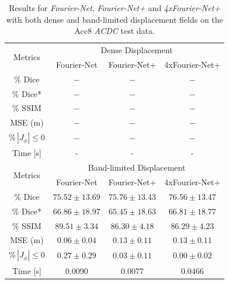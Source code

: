 \documentclass[english,version-2022-01]{uzl-thesis} %
\begin{document}
\begin{table}[H] %
	\centering
	\caption{Results for \emph{Fourier-Net}, \emph{Fourier-Net+} and \emph{4xFourier-Net+} with both dense and band-limited displacement fields on the Acc8 \emph{ACDC} test data.}
	\label{tab:DenseDisplacementAcc8}
	\begin{tabular}{c c c c} %
		\toprule
		\multirow{2}{*}{Metrics} & \multicolumn{3}{c}{Dense Displacement} \\
		\cline{2-4} 
		 & Fourier-Net & Fourier-Net+ & 4xFourier-Net+\\	
		\midrule
		$\%$ Dice & $-$ & $-$ & $-$\\
		$\%$ Dice* & $-$ & $-$ & $-$ \\
		$\%$ SSIM & $-$ & $-$ & $-$\\
		MSE (m) & $-$ & $-$ & $-$ \\
		$\% \, |J_{\phi}|\leq0$ & $-$ & $-$ & $-$ \\
		Time [s] 	  & - & - & -  \\
		\midrule
		\multirow{2}{*}{Metrics} & \multicolumn{3}{c}{Band-limited Displacement} \\
		\cline{2-4} 
		 & Fourier-Net & Fourier-Net+ & 4xFourier-Net+\\		
		\midrule
		$\%$ Dice & $75.52 \pm 13.69$ & $75.76 \pm 13.43$ & $76.56 \pm 13.47$\\
		$\%$ Dice* & $66.86 \pm 18.97$ & $65.45 \pm 18.63$ & $66.81 \pm 18.77$ \\
		$\%$ SSIM & $89.51 \pm 3.34$ & $86.30 \pm 4.18$ & $86.29 \pm 4.23$\\
		MSE (m) & $0.06 \pm 0.04$ & $0.13 \pm 0.11$ & $0.13 \pm 0.11$ \\
		$\% \, |J_{\phi}|\leq0$ & $0.27 \pm 0.29$ & $0.03 \pm 0.11$ & $0.00 \pm 0.02$ \\
		Time [s] 	  & 0.0090 & 0.0077 & 0.0466  \\
		\bottomrule
	\end{tabular}	
\end{table}
\end{document}
